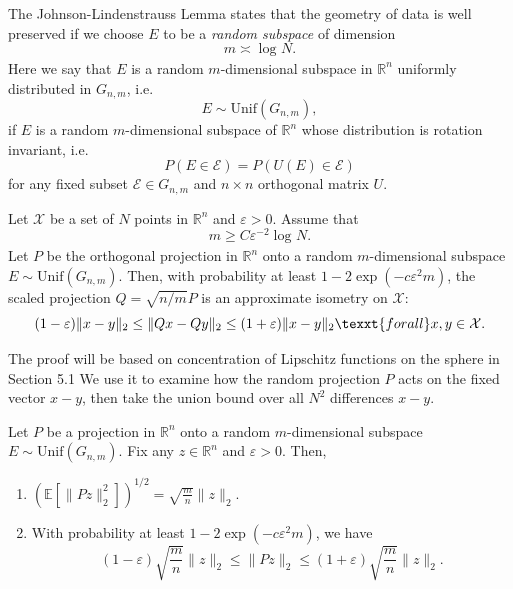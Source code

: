 The Johnson-Lindenstrauss Lemma states that the geometry of data is well preserved if we choose $E$ to be a 
\textit{random subspace} of dimension 
\[ m \asymp \log_{}{N}. \]
Here we say that $E$ is a random $m$-dimensional subspace in $\mathbb{R}^n$ uniformly distributed in $G_{n, m}$, 
i.e. 
\[ E \sim \mathrm{Unif}(G_{n,m}), \]
if $E$ is a random $m$-dimensional subspace of $\mathbb{R}^n$ whose distribution is rotation invariant, i.e. 
\[ P(E \in \mathcal{E}) = P(U(E) \in \mathcal{E}) \]
for any fixed subset $\mathcal{E} \in G_{n,m}$ and $n \times n$ orthogonal matrix $U$.

\begin{theorem}
\label{thm:5.3.1}
Let $\mathcal{X}$ be a set of $N$ points in $\mathbb{R}^n$ and $\varepsilon > 0$. Assume that 
\[ m \geq C \varepsilon^{-2}\log_{}{N}. \]
Let $P$ be the orthogonal projection in $\mathbb{R}^n$ onto a random $m$-dimensional subspace $E \sim 
\mathrm{Unif}(G_{n, m})$. Then, with probability at least $1 - 2 \exp{(-c \varepsilon^2 m)}$, the scaled 
projection $Q = \sqrt{n/m}P$ is an approximate isometry on $\mathcal{X}$:
\[ (1 - \varepsilon)\lVert x - y \rVert_{2} \leq \lVert Qx - Qy \rVert_{2} 
\leq (1 + \varepsilon)\lVert x - y \rVert_{2} \texxt{ for all } x, y \in \mathcal{X}. \]
\end{theorem}
The proof will be based on concentration of Lipschitz functions on the sphere in Section 5.1 We 
use it to examine how the random projection $P$ acts on the fixed vector $x - y$, then take the union bound over 
all $N^2$ differences $x - y$.

\begin{lemma}
\label{lem:5.3.2}
Let $P$ be a projection in $\mathbb{R}^n$ onto a random $m$-dimensional subspace $E \sim 
\mathrm{Unif}(G_{n,m})$. Fix any $z \in \mathbb{R}^n$ and $\varepsilon > 0$. Then,
\begin{enumerate}
	\item $(\mathbb{E}\left[ \lVert Pz \rVert_{2}^2 \right])^{1/2} = \sqrt{\frac{m}{n}} \lVert z \rVert_{2}$.
	\item With probability at least $1 - 2 \exp{(-c \varepsilon^2 m)}$, we have 
	\[ (1 - \varepsilon)\sqrt{\frac{m}{n}}\lVert z \rVert_{2} \leq \lVert Pz \rVert_{2} 
	\leq (1 + \varepsilon)\sqrt{\frac{m}{n}}\lVert z \rVert_{2}. \]
\end{enumerate}
\end{lemma}

